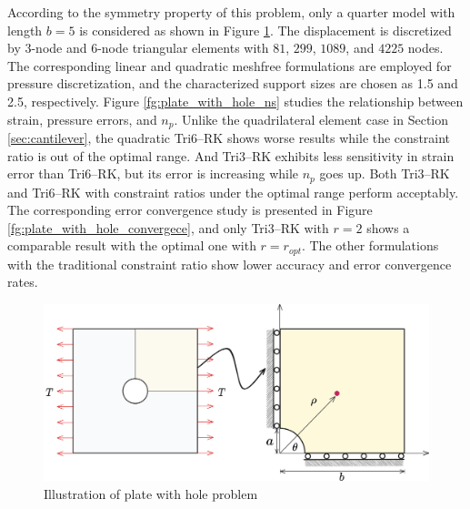 According to the symmetry property of this problem, only a quarter model with length $b=5$ is considered as shown in Figure \ref{fg:plate_with_hole_model}. The displacement is discretized by 3-node and 6-node triangular elements with $81$, $299$, $1089$, and $4225$ nodes. The corresponding linear and quadratic meshfree formulations are employed for pressure discretization, and the characterized support sizes are chosen as 1.5 and 2.5, respectively. Figure \ref{fg:plate_with_hole_ns} studies the relationship between strain, pressure errors, and $n_p$. Unlike the quadrilateral element case in Section \ref{sec:cantilever}, the quadratic Tri6--RK shows worse results while the constraint ratio is out of the optimal range. And Tri3--RK exhibits less sensitivity in strain error than Tri6--RK, but its error is increasing while $n_p$ goes up. Both Tri3--RK and Tri6--RK with constraint ratios under the optimal range perform acceptably. The corresponding error convergence study is presented in Figure \ref{fg:plate_with_hole_convergece}, and only Tri3--RK with $r=2$ shows a comparable result with the optimal one with $r=r_{opt}$. The other formulations with the traditional constraint ratio show lower accuracy and error convergence rates.

\begin{figure}[H]
\centering
\includegraphics[width=\textwidth]{png/plate_with_hole_model.png}
\caption{Illustration of plate with hole problem}\label{fg:plate_with_hole_model}
\end{figure}

